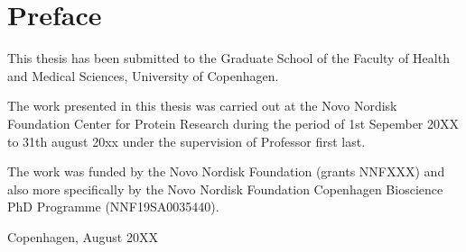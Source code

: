 \chapter*{\vspace{-5em}Preface}
\label{ch:preface}
\vspace{-8em}
This thesis has been submitted to the Graduate School of the Faculty of Health and Medical Sciences, University of Copenhagen. 

The work presented in this thesis was carried out at the Novo Nordisk Foundation Center for Protein Research during the period of 1st Sepember 20XX to 31th august 20xx under the supervision of Professor first last.

The work was funded by the Novo Nordisk Foundation (grants NNFXXX) and also more specifically by the Novo Nordisk Foundation Copenhagen Bioscience PhD Programme (NNF19SA0035440).


\begin{flushright}
	
	Copenhagen, August 20XX
	
	\vspace{1em}
	\thesisName
	
\end{flushright}